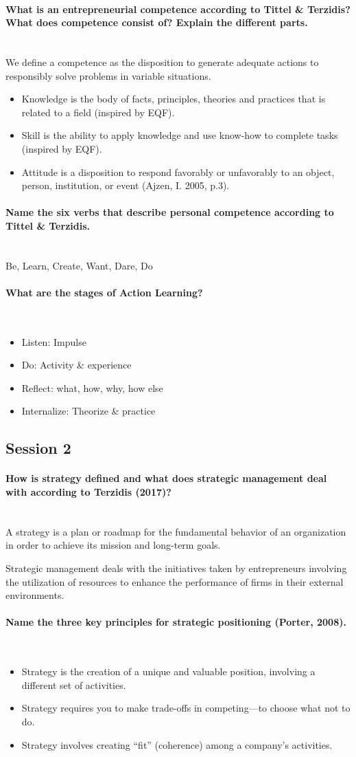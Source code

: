 \documentclass[10pt,a4paper,noendnumber=true]{scrartcl}
\newcommand{\properparagraph}[1]{\paragraph{\textcolor{Emerald}{#1}}\mbox{}\\}
\begin{document}
\properparagraph{What is an entrepreneurial competence according to Tittel \& Terzidis? What does competence consist of? Explain the different parts.}
We define a competence as the disposition to generate adequate actions to responsibly solve problems in variable situations.
\begin{itemize}
	\item Knowledge is the body of facts, principles, theories and 	practices that is related to a field (inspired by EQF).
	\item  Skill is the ability to apply knowledge and use know-how to complete tasks (inspired by EQF).
	\item  Attitude is a disposition to respond favorably or unfavorably to an object, person, institution, or event (Ajzen, I. 2005, p.3).
\end{itemize}


\properparagraph{Name the six verbs that describe personal competence according to Tittel \& Terzidis.}
Be, Learn, Create, Want, Dare, Do

\properparagraph{What are the stages of Action Learning?}
\begin{itemize}
	\item Listen: Impulse
	\item Do: Activity \& experience
	\item Reflect: what, how, why, how else
	\item Internalize: Theorize \& practice
\end{itemize}





\newpage
\subsection{Session 2}
\properparagraph{How is strategy defined and what does strategic management deal with according to Terzidis (2017)?}
A strategy is a plan or roadmap for the fundamental behavior of an organization in order to achieve its mission and long-term goals.

Strategic management deals with the initiatives taken by entrepreneurs involving the utilization of resources to enhance the performance of firms in their external environments.

\properparagraph{Name the three key principles for strategic positioning (Porter, 2008).}
\begin{itemize}
	\item Strategy is the creation of a unique and valuable position, involving a different set of activities.
	\item Strategy requires you to make	trade-offs in competing—to choose what not to do.
	\item Strategy involves creating “fit” (coherence) among a company’s activities.
\end{itemize}
\end{document}
